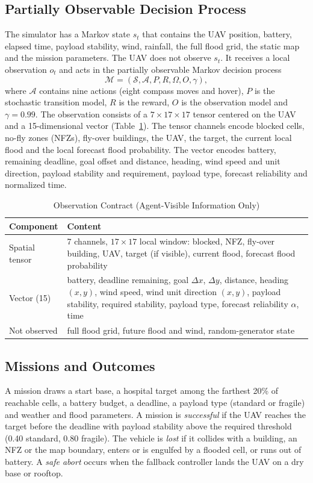 \documentclass{ieeeaccess}
\begin{document}
\subsection{Partially Observable Decision Process}
The simulator has a Markov state $s_t$ that contains the UAV position, battery, elapsed time, payload stability, wind, rainfall, the full flood grid, the static map and the mission parameters. The UAV does not observe $s_t$. It receives a local observation $o_t$ and acts in the partially observable Markov decision process
\begin{equation}
\mathcal{M}=(\mathcal{S},\mathcal{A},P,R,\Omega,O,\gamma),
\label{eq:pomdp}
\end{equation}
where $\mathcal{A}$ contains nine actions (eight compass moves and hover), $P$ is the stochastic transition model, $R$ is the reward, $O$ is the observation model and $\gamma=0.99$. The observation consists of a $7\times17\times17$ tensor centered on the UAV and a 15-dimensional vector (Table~\ref{tab:obs}). The tensor channels encode blocked cells, no-fly zones (NFZs), fly-over buildings, the UAV, the target, the current local flood and the local forecast flood probability. The vector encodes battery, remaining deadline, goal offset and distance, heading, wind speed and unit direction, payload stability and requirement, payload type, forecast reliability and normalized time.

\begin{table}[t]
\caption{Observation Contract (Agent-Visible Information Only)}
\label{tab:obs}
\setlength{\tabcolsep}{4pt}
\begin{tabular}{@{}p{70pt}p{168pt}@{}}
\toprule
Component & Content \\
\midrule
Spatial tensor & 7 channels, $17\times17$ local window: blocked, NFZ, fly-over building, UAV, target (if visible), current flood, forecast flood probability \\
Vector (15) & battery, deadline remaining, goal $\Delta x$, $\Delta y$, distance, heading $(x,y)$, wind speed, wind unit direction $(x,y)$, payload stability, required stability, payload type, forecast reliability $\alpha$, time \\
Not observed & full flood grid, future flood and wind, random-generator state \\
\bottomrule
\end{tabular}
\end{table}

\subsection{Missions and Outcomes}
A mission draws a start base, a hospital target among the farthest 20\% of reachable cells, a battery budget, a deadline, a payload type (standard or fragile) and weather and flood parameters. A mission is \emph{successful} if the UAV reaches the target before the deadline with payload stability above the required threshold (0.40 standard, 0.80 fragile). The vehicle is \emph{lost} if it collides with a building, an NFZ or the map boundary, enters or is engulfed by a flooded cell, or runs out of battery. A \emph{safe abort} occurs when the fallback controller lands the UAV on a dry base or rooftop.
\end{document}
